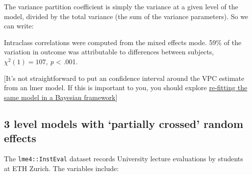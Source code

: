 \documentclass[]{article}
\newenvironment{Shaded}{\begin{snugshade}}{\end{snugshade}}
\newcommand{\CommentTok}[1]{\textcolor[rgb]{0.56,0.35,0.01}{\textit{#1}}}
\newcommand{\DataTypeTok}[1]{\textcolor[rgb]{0.13,0.29,0.53}{#1}}
\newcommand{\DecValTok}[1]{\textcolor[rgb]{0.00,0.00,0.81}{#1}}
\newcommand{\ErrorTok}[1]{\textcolor[rgb]{0.64,0.00,0.00}{\textbf{#1}}}
\newcommand{\FloatTok}[1]{\textcolor[rgb]{0.00,0.00,0.81}{#1}}
\newcommand{\KeywordTok}[1]{\textcolor[rgb]{0.13,0.29,0.53}{\textbf{#1}}}
\newcommand{\NormalTok}[1]{#1}
\newcommand{\OperatorTok}[1]{\textcolor[rgb]{0.81,0.36,0.00}{\textbf{#1}}}
\newcommand{\StringTok}[1]{\textcolor[rgb]{0.31,0.60,0.02}{#1}}
\begin{document}
The variance partition coefficient is simply the variance at a given level of
the model, divided by the total variance (the sum of the variance parameters).
So we can write:

\begin{Shaded}
\end{Shaded}

{Intraclass correlations were computed from the mixed effects mode. 59\% of the
variation in outcome was attributable to differences between subjects,
\(\chi^2(1) = 107\), \emph{p} \textless{} .001.}

{[}It's not straightforward to put an confidence interval around the VPC estimate
from an lmer model. If this is important to you, you should explore
\protect\hyperlink{bayes-mcmc}{re-fitting the same model in a Bayesian framework}{]}

\hypertarget{threelevel}{%
\subsection*{3 level models with `partially crossed' random effects}\label{threelevel}}

The \texttt{lme4::InstEval} dataset records University lecture evaluations by students
at ETH Zurich. The variables include:
\end{document}
